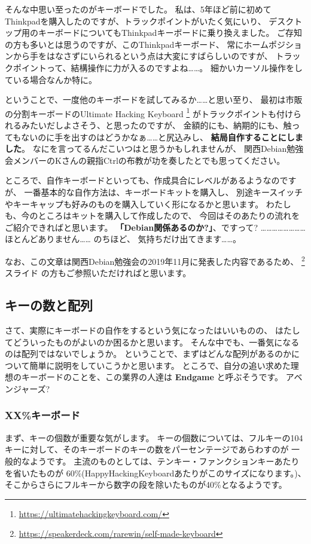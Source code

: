 \documentclass[mingoth,a4paper]{jsarticle}
\begin{document}
そんな中思い至ったのがキーボードでした。
私は、5年ほど前に初めてThinkpadを購入したのですが、トラックポイントがいたく気にいり、
デスクトップ用のキーボードについてもThinkpadキーボードに乗り換えました。
ご存知の方も多いとは思うのですが、このThinkpadキーボード、
常にホームポジションから手をはなさずにいられるという点は大変にすばらしいのですが、
トラックポイントって、結構操作に力が入るのですよね……。
細かいカーソル操作をしている場合なんか特に。

ということで、一度他のキーボードを試してみるか……と思い至り、
最初は市販の分割キーボードのUltimate Hacking Keyboard%
\footnote{\url{https://ultimatehackingkeyboard.com/}}
がトラックポイントも付けられるみたいだしよさそう、と思ったのですが、
金額的にも、納期的にも、触ってもないのに手を出すのはどうかなぁ……と尻込みし、
\textbf{結局自作することにしました}。
なにを言ってるんだこいつはと思うかもしれませんが、
関西Debian勉強会メンバーのKさんの親指Ctrlの布教が功を奏したとでも思ってください。

ところで、自作キーボードといっても、作成具合にレベルがあるようなのですが、
一番基本的な自作方法は、キーボードキットを購入し、
別途キースイッチやキーキャップも好みのものを購入していく形になるかと思います。
わたしも、今のところはキットを購入して作成したので、
今回はそのあたりの流れをご紹介できればと思います。
\textbf{「Debian関係あるのか?」}、ですって?
{\scriptsize ……………………ほとんどありません……} のちほど、
気持ちだけ出てきます……。

なお、この文章は関西Debian勉強会の2019年11月に発表した内容であるため、
\footnote{\url{https://speakerdeck.com/rarewin/self-made-keyboard}}{スライド}
の方もご参照いただければと思います。

\subsection{キーの数と配列}

さて、実際にキーボードの自作をするという気になったはいいものの、
はたしてどういったものがよいのか困るかと思います。
そんな中でも、一番気になるのは配列ではないでしょうか。
ということで、まずはどんな配列があるのかについて簡単に説明をしていこうかと思います。
ところで、自分の追い求めた理想のキーボードのことを、この業界の人達は \textbf{Endgame} と呼ぶそうです。
アベンジャーズ?

\subsubsection*{XX\%キーボード}

まず、キーの個数が重要な気がします。
キーの個数については、フルキーの104キーに対して、そのキーボードのキーの数をパーセンテージであらわすのが
一般的なようです。
主流のものとしては、テンキー・ファンクションキーあたりを省いたものが
60\%(HappyHackingKeyboardあたりがこのサイズになります。)、
そこからさらにフルキーから数字の段を除いたものが40\%となるようです。
\end{document}
